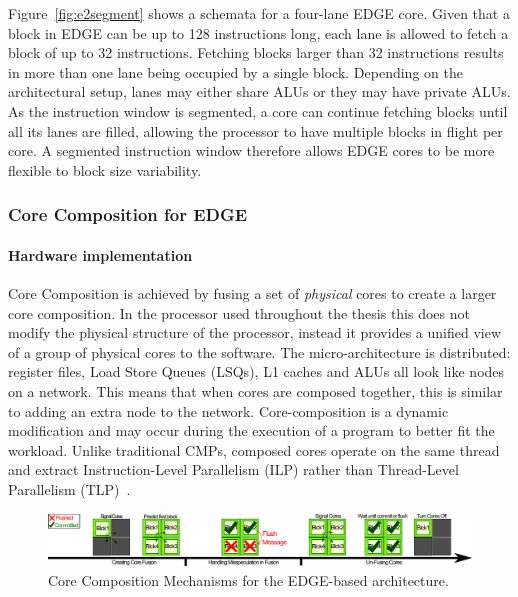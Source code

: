Figure~\ref{fig:e2segment} shows a schemata for a four-lane EDGE core.
Given that a block in EDGE can be up to 128 instructions long, each lane is allowed to fetch a block of up to 32 instructions.
Fetching blocks larger than 32 instructions results in more than one lane being occupied by a single block.
Depending on the architectural setup, lanes may either share ALUs or they may have private ALUs.
As the instruction window is segmented, a core can continue fetching blocks until all its lanes are filled, allowing the processor to have multiple blocks in flight per core.
A segmented instruction window therefore allows EDGE cores to be more flexible to block size variability.

\subsubsection{Core Composition for EDGE}\label{chp:Background:sec:EDGE}

\paragraph*{Hardware implementation}
Core Composition is achieved by fusing a set of \textit{physical} cores to create a larger core composition.
In the processor used throughout the thesis this does not modify the physical structure of the processor, instead it provides a unified view of a group of physical cores to the software.
The micro-architecture is distributed: register files, Load Store Queues (LSQs), L1 caches and ALUs all look like nodes on a network.
This means that when cores are composed together, this is similar to adding an extra node to the network.
Core-composition is a dynamic modification and may occur during the execution of a program to better fit the workload.
Unlike traditional CMPs, composed cores operate on the same thread and extract Instruction-Level Parallelism (ILP) rather than Thread-Level Parallelism (TLP)~\cite{micolet2016dmpstream,pricopi2012bahurupi}.

\begin{figure}
 \center
 \includegraphics[width=1\textwidth]{cases-paper/graphics/background/proc_test.pdf}
 \caption{Core Composition Mechanisms for the EDGE-based architecture.}\label{fig:dmp}
 \end{figure}
 
